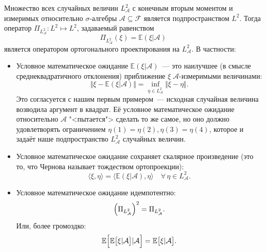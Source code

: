     Множество всех случайных величин $L^2_{\mathcal{A}}$ с конечным вторым моментом и измеримых относительно $\sigma$-алгебры $\mathcal{A} \subseteq \mathcal{F}$ является подпространством $L^2 \!$.
    Тогда оператор $\Pi_{L^2_{\mathcal{A}}} \colon L^2 \mapsto L^2$, задаваемый равенством
    \begin{equation*}
        \Pi_{L^2_{\mathcal{A}}}(\xi) = \mathbb{E}\left(\xi | \mathcal{A}\right)
    \end{equation*}
    является оператором ортогонального проектирования на $L^2_{\mathcal{A}}$.
    В частности:
    \begin{itemize}
        \item 
            Условное математическое ожидание $\mathbb{E} \left(\xi | \mathcal{A}\right)$~--- это наилучшее (в смысле среднеквадратичного отклонения) приближение $\xi \; \mathcal{A}$-измеримыми величинами:
            \begin{equation*}
                \Vert \xi - \mathbb{E}\left(\xi | \mathcal{A} \right) \Vert = \inf\limits_{\eta \in L^2_{\mathcal{A}}} \Vert \xi - \eta \Vert.
            \end{equation*}
            Это согласуется с нашим первым примером~--- исходная случайная величина возводила аргумент в квадрат.
            Её условное математическое ожидание относительно $\mathcal{A}$ "<пытается"> сделать то же самое, 
            но оно должно удовлетворять ограничением $\eta(1) = \eta(2), \eta(3) = \eta(4)$, которое и задаёт наше подпространство $L^2_{\mathcal{A}}$ случайных величин.
        \item
            Условное математическое ожидание сохраняет скалярное произведение (это то, что Чернова называет тождеством ортопроекции):
            \begin{equation*}
                \langle \xi, \eta \rangle = \langle \mathbb{E}\left(\xi | \mathcal{A} \right), \eta \rangle \quad \forall \, \eta \in L^2_{\mathcal{A}}.
            \end{equation*}
        \item
            Условное математическое ожидание идемпотентно:
            \begin{equation*}
                \Bigl( \Pi_{L^2_{\mathcal{A}}} \Bigr)^2 = \Pi_{L^2_{\mathcal{A}}}.
            \end{equation*}
            Или, более громоздко:
            \begin{equation*}
                \mathbb{E} \Bigl[ \mathbb{E} \bigl[ \xi | \mathcal{A}\bigr] | \mathcal{A} \Bigr] = \mathbb{E} \bigl[ \xi | \mathcal{A}\bigr].
            \end{equation*}
    \end{itemize}

